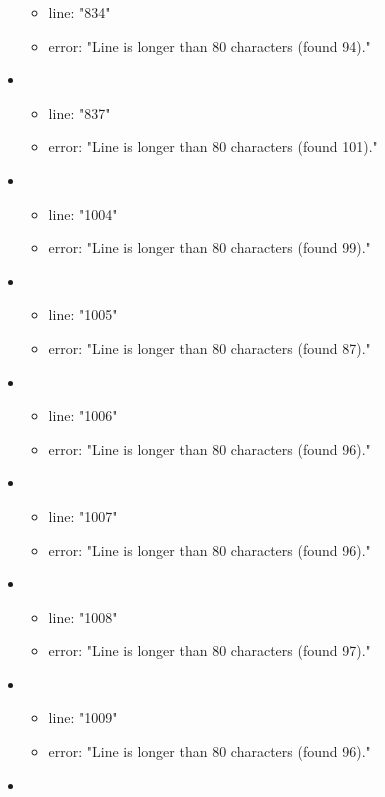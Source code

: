\begin{itemize}
\begin{itemize}
		\item line: "834" 
		\item error: "Line is longer than 80 characters (found 94)." 
	\end{itemize}
	\item 
	\begin{itemize} 
		\item line: "837" 
		\item error: "Line is longer than 80 characters (found 101)." 
	\end{itemize}
	\item 
	\begin{itemize} 
		\item line: "1004" 
		\item error: "Line is longer than 80 characters (found 99)." 
	\end{itemize}
	\item 
	\begin{itemize} 
		\item line: "1005" 
		\item error: "Line is longer than 80 characters (found 87)." 
	\end{itemize}
	\item 
	\begin{itemize} 
		\item line: "1006" 
		\item error: "Line is longer than 80 characters (found 96)." 
	\end{itemize}
	\item 
	\begin{itemize} 
		\item line: "1007" 
		\item error: "Line is longer than 80 characters (found 96)." 
	\end{itemize}
	\item 
	\begin{itemize} 
		\item line: "1008" 
		\item error: "Line is longer than 80 characters (found 97)." 
	\end{itemize}
	\item 
	\begin{itemize} 
		\item line: "1009" 
		\item error: "Line is longer than 80 characters (found 96)." 
	\end{itemize}
	\item 
	\begin{itemize} 

\end{itemize}
\end{itemize}
